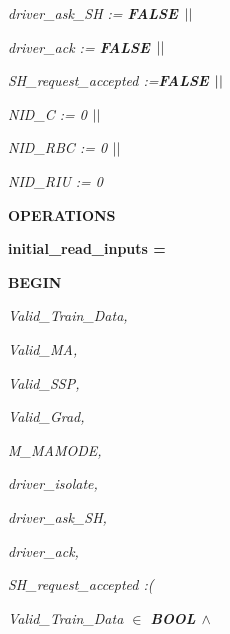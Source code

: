 \documentclass[11pt]{article}
\begin{document}
\begin{sloppypar}
\hspace*{0.20in}\it driver\_ask\_SH \rm := \bf FALSE  $\mbox{$\mid\mid$}$ 

\hspace*{0.20in}\it driver\_ack \rm := \bf FALSE  $\mbox{$\mid\mid$}$ 

\hspace*{0.20in}\it SH\_request\_accepted \rm :=\hspace*{0.10in}\bf FALSE  $\mbox{$\mid\mid$}$ 

\hspace*{0.20in}\it NID\_C \rm := \rm 0  $\mbox{$\mid\mid$}$ 

\hspace*{0.20in}\it NID\_RBC \rm := \rm 0  $\mbox{$\mid\mid$}$ 

\hspace*{0.20in}\it NID\_RIU \rm := \rm 0

\hspace*{0.20in}

\bf OPERATIONS

\hspace*{0.20in}

\hspace*{0.20in}\bf initial\_read\_inputs \rm =

\hspace*{0.20in}\bf BEGIN

\hspace*{0.40in}\it Valid\_Train\_Data\rm ,

\hspace*{0.40in}\it Valid\_MA\rm ,

\hspace*{0.40in}\it Valid\_SSP\rm ,

\hspace*{0.40in}\it Valid\_Grad\rm ,

\hspace*{0.40in}\it M\_MAMODE\rm ,

\hspace*{0.40in}\it driver\_isolate\rm ,

\hspace*{0.40in}\it driver\_ask\_SH\rm ,

\hspace*{0.40in}\it driver\_ack\rm ,

\hspace*{0.40in}\it SH\_request\_accepted \rm :\rm (

\hspace*{0.60in}\it Valid\_Train\_Data  $\in$ \hspace*{0.10in}\bf BOOL  $\land$ 


\end{sloppypar}
\end{document}

